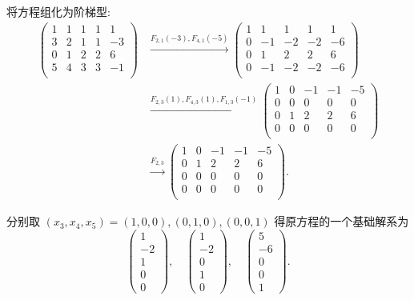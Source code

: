 \documentclass{ctexart}
\begin{document}
\begin{solution}
    将方程组化为阶梯型:
    \begin{align*}
        \begin{pmatrix}
            1 & 1 & 1 & 1 & 1 \\
            3 & 2 & 1 & 1 & -3 \\
            0 & 1 & 2 & 2 & 6 \\
            5 & 4 & 3 & 3 & -1 \\
        \end{pmatrix} & \xrightarrow{F_{2,1}(-3),F_{4,1}(-5)}\begin{pmatrix}
            1 & 1 & 1 & 1 & 1 \\
            0 & -1 & -2 & -2 & -6 \\
            0 & 1 & 2 & 2 & 6 \\
            0 & -1 & -2 & -2 & -6 \\
        \end{pmatrix} \\
        & \xrightarrow{F_{2,3}(1),F_{4,3}(1),F_{1,3}(-1)}\begin{pmatrix}
            1 & 0 & -1 & -1 & -5 \\
            0 & 0 & 0 & 0 & 0 \\
            0 & 1 & 2 & 2 & 6 \\
            0 & 0 & 0 & 0 & 0 \\
        \end{pmatrix} \\
        & \xrightarrow{F_{2,3}}\begin{pmatrix}
            1 & 0 & -1 & -1 & -5 \\
            0 & 1 & 2 & 2 & 6 \\
            0 & 0 & 0 & 0 & 0 \\
            0 & 0 & 0 & 0 & 0 \\
        \end{pmatrix}.
    \end{align*}

    分别取 $(x_3,x_4,x_5)=(1,0,0),(0,1,0),(0,0,1)$ 得原方程的一个基础解系为
    \[\begin{pmatrix}
        1 \\ -2 \\ 1 \\ 0 \\ 0
    \end{pmatrix},\quad\begin{pmatrix}
        1 \\ -2 \\ 0 \\ 1 \\ 0
    \end{pmatrix},\quad\begin{pmatrix}
        5 \\ -6 \\ 0 \\ 0 \\ 1
    \end{pmatrix}.\]
\end{solution}
\end{document}
